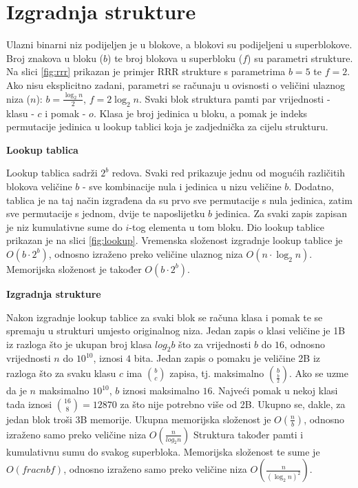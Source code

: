 \documentclass[times, utf8, seminar, numeric]{fer}
\begin{document}
\section{Izgradnja strukture}
\label{sec:izgradnja-rrr}
Ulazni binarni niz podijeljen je u blokove, a blokovi su podijeljeni u superblokove. Broj znakova u bloku ($b$) te broj blokova u superbloku ($f$) su parametri strukture. Na slici \ref{fig:rrr} prikazan je primjer RRR strukture s parametrima $b=5$ te $f=2$. Ako nisu eksplicitno zadani, parametri se računaju u ovisnosti o veličini ulaznog niza ($n$):
$b=\frac{\log_2n}{2}$,
$f=2  \log_2n$.
Svaki blok struktura pamti par vrijednosti - klasu  - $c$ i pomak  - $o$. Klasa je broj jedinica u bloku, a pomak je indeks permutacije jedinica u lookup tablici koja je zadjednička za cijelu strukturu. 

\textbf{Lookup tablica}

Lookup tablica sadrži $2^b$ redova. Svaki red prikazuje jednu od mogućih različitih blokova veličine $b$ - sve kombinacije nula i jedinica u nizu veličine $b$. Dodatno, tablica je na taj način izgrađena da su prvo sve permutacije s nula jedinica, zatim sve permutacije s jednom, dvije te naposlijetku $b$ jedinica. Za svaki zapis zapisan je niz kumulativne sume do $i$-tog elementa u tom bloku. Dio lookup tablice prikazan je na slici \ref{fig:lookup}. Vremenska složenost izgradnje lookup tablice je $O(b \cdot 2^b)$, odnosno izraženo preko veličine ulaznog niza $O(n \cdot \log_2n)$. Memorijska složenost je također $O(b \cdot 2^b)$.

\textbf{Izgradnja strukture}

Nakon izgradnje lookup tablice za svaki blok se računa klasa i pomak te se spremaju u strukturi umjesto originalnog niza. Jedan zapis o klasi veličine je 1B iz razloga što je ukupan broj klasa $log_2b$ što za vrijednosti $b$ do $16$, odnosno vrijednosti $n$ do $10^{10}$, iznosi $4$ bita. Jedan zapis o pomaku je veličine 2B iz razloga što za svaku klasu $c$ ima $\binom{b}{c}$ zapisa, tj. maksimalno $\binom{b}{\frac{b}{2}}$. Ako se uzme da je $n$ maksimalno $10^{10}$, $b$ iznosi maksimalno $16$. Najveći pomak u nekoj klasi tada iznosi $\binom{16}{8}=12870$ za što nije potrebno više od 2B.  Ukupno se, dakle, za jedan blok troši 3B memorije. Ukupna memorijska složenost je $O(\frac{n}{b})$, odnosno izraženo samo preko veličine niza $O(\frac{n}{log_2n})$
Struktura također pamti i kumulativnu sumu do svakog superbloka. Memorijska složenost te sume je $O(frac{n}{b f})$, odnosno izraženo samo preko veličine niza $O(\frac{n}{(\log_2n)^2})$.
\end{document}
